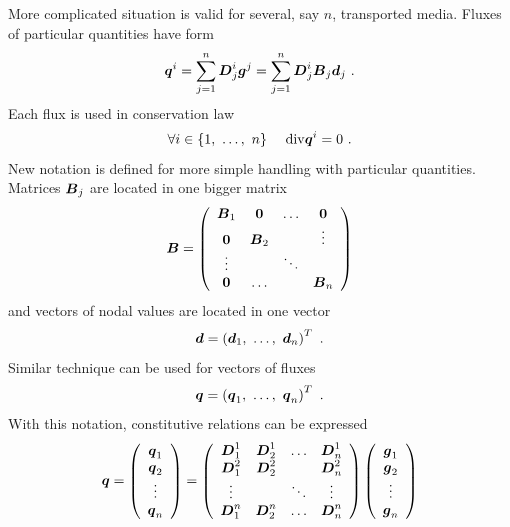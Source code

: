 More complicated situation is valid for several, say $n$, transported media. Fluxes of particular quantities
have form
\begin{equation}
\mbox{\boldmath$q$}^i = \sum_{j=1}^n \mbox{\boldmath$D$}_j^i \mbox{\boldmath$g$}^j = \sum_{j=1}^n \mbox{\boldmath$D$}_j^i \mbox{\boldmath$B$}_j \mbox{\boldmath$d$}_j\ .
\end{equation}
Each flux is used in conservation law
\begin{equation}
\forall i \in \{1,\ \ldots,\ n\}\ \ \ \ {\rm div} \mbox{\boldmath$q$}^i = 0\ .
\end{equation}
New notation is defined for more simple handling with particular quantities. Matrices $\mbox{\boldmath$B$}_j$
are located in one bigger matrix
\begin{equation}
\mbox{\boldmath$B$} = \left(\begin{array}{cccc}
\mbox{\boldmath$B$}_1 & \mbox{\boldmath$0$}   & \ldots & \mbox{\boldmath$0$}
\\
\mbox{\boldmath$0$}   & \mbox{\boldmath$B$}_2 &        & \vdots
\\
\vdots    &           & \ddots &
\\
\mbox{\boldmath$0$}   & \ldots    &        & \mbox{\boldmath$B$}_n
\end{array}\right)
\end{equation}
and vectors of nodal values are located in one vector
\begin{equation}
\mbf{d} = \left(\mbf{d}_1,\ \ldots,\ \mbf{d}_n\right)^T\ .
\end{equation}
Similar technique can be used for vectors of fluxes
\begin{equation}
\mbox{\boldmath$q$} = \left(\mbox{\boldmath$q$}_1,\ \ldots,\ \mbox{\boldmath$q$}_n\right)^T\ .
\end{equation}
With this notation, constitutive relations can be expressed
\begin{equation}
\mbox{\boldmath$q$} = \left(\begin{array}{c}
\mbox{\boldmath$q$}_1
\\
\mbox{\boldmath$q$}_2
\\
\vdots
\\
\mbox{\boldmath$q$}_n
\end{array}\right) = \left(\begin{array}{cccc}
\mbox{\boldmath$D$}_1^1 & \mbox{\boldmath$D$}_2^1 & \ldots & \mbox{\boldmath$D$}_n^1
\\
\mbox{\boldmath$D$}_1^2 & \mbox{\boldmath$D$}_2^2 &        & \mbox{\boldmath$D$}_n^2
\\
\vdots      &             & \ddots & \vdots
\\
\mbox{\boldmath$D$}_1^n & \mbox{\boldmath$D$}_2^n & \ldots & \mbox{\boldmath$D$}_n^n
\end{array}\right)
\left(\begin{array}{c}
\mbox{\boldmath$g$}_1
\\
\mbox{\boldmath$g$}_2
\\
\vdots
\\
\mbox{\boldmath$g$}_n
\end{array}\right)
\end{equation}
